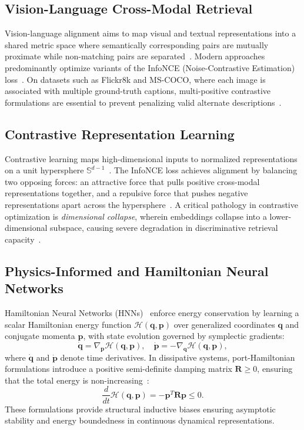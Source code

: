 \documentclass[conference]{IEEEtran}
\begin{document}
\subsection{Vision-Language Cross-Modal Retrieval}
Vision-language alignment aims to map visual and textual representations into a shared metric space where semantically corresponding pairs are mutually proximate while non-matching pairs are separated~\cite{radford2021learning,wang2016comprehensive}. Modern approaches predominantly optimize variants of the InfoNCE (Noise-Contrastive Estimation) loss~\cite{oord2018representation,chen2020simple,he2020momentum}. On datasets such as Flickr8k and MS-COCO, where each image is associated with multiple ground-truth captions, multi-positive contrastive formulations are essential to prevent penalizing valid alternate descriptions~\cite{hodosh2013framing}.

\subsection{Contrastive Representation Learning}
Contrastive learning maps high-dimensional inputs to normalized representations on a unit hypersphere $\mathbb{S}^{d-1}$~\cite{chen2020simple,he2020momentum}. The InfoNCE loss achieves alignment by balancing two opposing forces: an attractive force that pulls positive cross-modal representations together, and a repulsive force that pushes negative representations apart across the hypersphere~\cite{wang2020understanding}. A critical pathology in contrastive optimization is \textit{dimensional collapse}, wherein embeddings collapse into a lower-dimensional subspace, causing severe degradation in discriminative retrieval capacity~\cite{jing2022understanding}.

\subsection{Physics-Informed and Hamiltonian Neural Networks}
Hamiltonian Neural Networks (HNNs)~\cite{greydanus2019hamiltonian} enforce energy conservation by learning a scalar Hamiltonian energy function $\mathcal{H}(\mathbf{q}, \mathbf{p})$ over generalized coordinates $\mathbf{q}$ and conjugate momenta $\mathbf{p}$, with state evolution governed by symplectic gradients:
\begin{equation}
\label{eq:prior_hamiltonian}
\dot{\mathbf{q}} = \nabla_{\mathbf{p}} \mathcal{H}(\mathbf{q}, \mathbf{p}), \quad \dot{\mathbf{p}} = -\nabla_{\mathbf{q}} \mathcal{H}(\mathbf{q}, \mathbf{p}),
\end{equation}
where $\dot{\mathbf{q}}$ and $\dot{\mathbf{p}}$ denote time derivatives. In dissipative systems, port-Hamiltonian formulations introduce a positive semi-definite damping matrix $\mathbf{R} \ge 0$, ensuring that the total energy is non-increasing~\cite{vanderschaft2000}:
\begin{equation}
\label{eq:prior_dissipative}
\frac{d}{dt}\mathcal{H}(\mathbf{q}, \mathbf{p}) = -\mathbf{p}^T \mathbf{R} \mathbf{p} \le 0.
\end{equation}
These formulations provide structural inductive biases ensuring asymptotic stability and energy boundedness in continuous dynamical representations.
\end{document}

